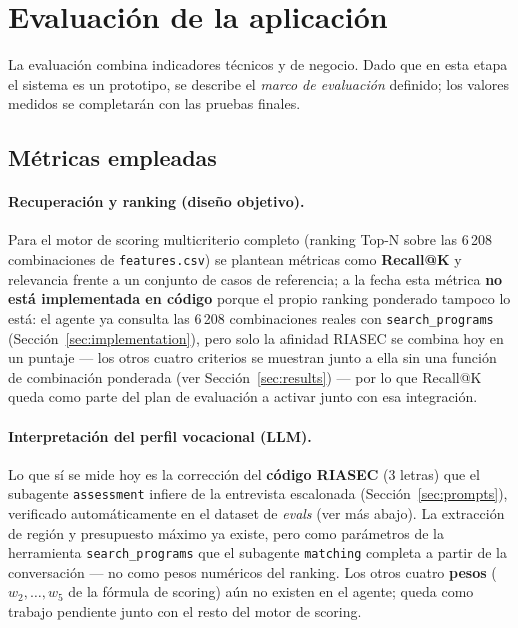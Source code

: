 \section{Evaluaci\'on de la aplicaci\'on}

La evaluaci\'on combina indicadores t\'ecnicos y de negocio. Dado que en esta
etapa el sistema es un prototipo, se describe el \emph{marco de evaluaci\'on}
definido; los valores medidos se completar\'an con las pruebas finales.

\subsection{M\'etricas empleadas}

\paragraph{Recuperaci\'on y ranking (dise\~no objetivo).} Para el motor de
scoring multicriterio completo (ranking Top-N sobre las 6\,208 combinaciones
de \texttt{features.csv}) se plantean m\'etricas como \textbf{Recall@K} y
relevancia frente a un conjunto de casos de referencia; a la fecha esta
m\'etrica \textbf{no est\'a implementada en c\'odigo} porque el propio ranking
ponderado tampoco lo est\'a: el agente ya consulta las 6\,208 combinaciones
reales con \texttt{search\_programs} (Secci\'on~\ref{sec:implementation}),
pero solo la afinidad RIASEC se combina hoy en un puntaje --- los otros cuatro
criterios se muestran junto a ella sin una funci\'on de combinaci\'on
ponderada (ver Secci\'on~\ref{sec:results}) --- por lo que Recall@K queda
como parte del plan de evaluaci\'on a activar junto con esa integraci\'on.

\paragraph{Interpretaci\'on del perfil vocacional (LLM).} Lo que s\'i se mide
hoy es la correcci\'on del \textbf{c\'odigo RIASEC} (3 letras) que el
subagente \texttt{assessment} infiere de la entrevista escalonada
(Secci\'on~\ref{sec:prompts}), verificado autom\'aticamente en el dataset de
\emph{evals} (ver m\'as abajo). La extracci\'on de regi\'on y presupuesto
m\'aximo ya existe, pero como par\'ametros de la herramienta
\texttt{search\_programs} que el subagente \texttt{matching} completa a
partir de la conversaci\'on --- no como pesos num\'ericos del ranking. Los
otros cuatro \textbf{pesos} ($w_2,\dots,w_5$ de la f\'ormula de scoring)
a\'un no existen en el agente; queda como trabajo pendiente junto con el
resto del motor de scoring.

